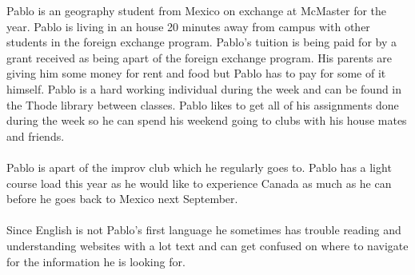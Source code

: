 \documentclass[10pt]{article}
\begin{document}
Pablo is an geography student from Mexico on exchange at McMaster for the year. Pablo is living in an house 20 minutes away from campus with other students in the foreign exchange program. Pablo's tuition is being paid for by a grant received as being apart of the foreign exchange program. His parents are giving him some money for rent and food but Pablo has to pay for some of it himself. Pablo is a hard working individual during the week and can be found in the Thode library between classes. Pablo likes to get all of his assignments done during the week so he can spend his weekend going to clubs with his house mates and friends.\\ \\
Pablo is apart of the improv club which he regularly goes to. Pablo has a light course load this year as he would like to experience Canada as much as he can before he goes back to Mexico next September.\\ \\
Since English is not Pablo's first language he sometimes has trouble reading and understanding websites with a lot text and can get confused on where to navigate for the information he is looking for.

\newpage


\end{document}
